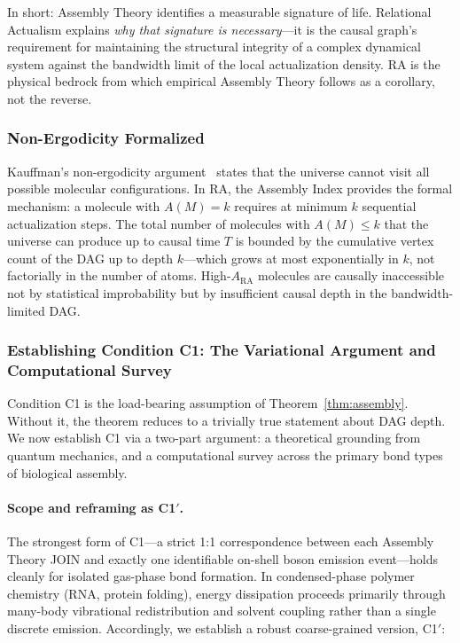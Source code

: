 \documentclass[11pt,a4paper]{article}
\theoremstyle{plain}
\theoremstyle{definition}
\theoremstyle{remark}
\newcommand{\ARA}{A_{\mathrm{RA}}}
\begin{document}
In short: Assembly Theory identifies a measurable signature of life.  Relational
Actualism explains \emph{why that signature is necessary}---it is the causal
graph's requirement for maintaining the structural integrity of a complex
dynamical system against the bandwidth limit of the local actualization density.
RA is the physical bedrock from which empirical Assembly Theory follows as a
corollary, not the reverse.

\subsubsection{Non-Ergodicity Formalized}

Kauffman's non-ergodicity argument~\citep{Kauffman2000} states that the universe
cannot visit all possible molecular configurations. In RA, the Assembly Index
provides the formal mechanism: a molecule with $A(M) = k$ requires at minimum $k$
sequential actualization steps. The total number of molecules with $A(M) \leq k$
that the universe can produce up to causal time $T$ is bounded by the cumulative
vertex count of the DAG up to depth $k$---which grows at most exponentially in $k$,
not factorially in the number of atoms. High-$\ARA$ molecules are causally
inaccessible not by statistical improbability but by insufficient causal depth in
the bandwidth-limited DAG.

\subsubsection{Establishing Condition C1: The Variational Argument and Computational Survey}
\label{sec:c1proof}

Condition C1 is the load-bearing assumption of Theorem~\ref{thm:assembly}. Without
it, the theorem reduces to a trivially true statement about DAG depth. We now
establish C1 via a two-part argument: a theoretical grounding from quantum mechanics,
and a computational survey across the primary bond types of biological assembly.

\paragraph{Scope and reframing as C1$'$.}
The strongest form of C1---a strict 1:1 correspondence between each Assembly Theory
JOIN and exactly one identifiable on-shell boson emission event---holds cleanly for
isolated gas-phase bond formation. In condensed-phase polymer chemistry (RNA,
protein folding), energy dissipation proceeds primarily through many-body
vibrational redistribution and solvent coupling rather than a single discrete
emission. Accordingly, we establish a robust coarse-grained version, C1$'$:
\end{document}
